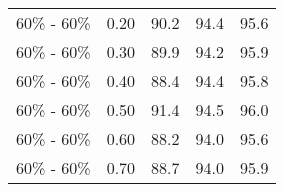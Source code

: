 \begin{tabular}{lrrrr}
                              60\% - 60\% &                        0.20 &  90.2 & 94.4 &  95.6 \\
                              60\% - 60\% &                        0.30 &  89.9 & 94.2 &  95.9 \\
                              60\% - 60\% &                        0.40 &  88.4 & 94.4 &  95.8 \\
                              60\% - 60\% &                        0.50 &  91.4 & 94.5 &  96.0 \\
                              60\% - 60\% &                        0.60 &  88.2 & 94.0 &  95.6 \\
                              60\% - 60\% &                        0.70 &  88.7 & 94.0 &  95.9 \\
\bottomrule
\end{tabular}
